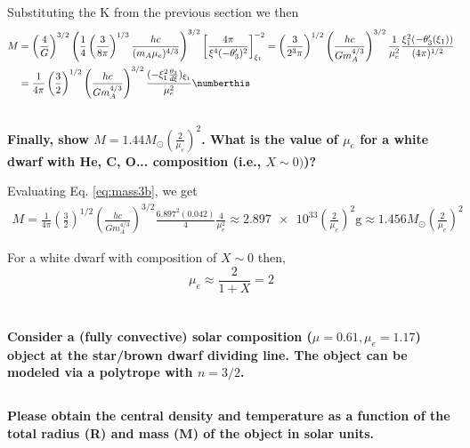 Substituting the K from the previous section we then
\begin{align*}
    M &= \left(\frac{4}{G}\right)^{3/2}\left(\frac{1}{4}\left(\frac{3}{8\pi}\right)^{1/3}\frac{hc}{(m_A\mu_e)^{4/3}}\right)^{3/2}\left[\frac{4\pi}{\xi^{4}(-\theta^\prime_3)^{2}}\right]^{-2}_{\xi_1} 
    = \left(\frac{3}{2^3\pi}\right)^{1/2}\left(\frac{hc}{Gm_A^{4/3}}\right)^{3/2}\frac{1}{\mu_e^2}\frac{\xi_1^2(-\theta_3^\prime(\xi_1))}{(4\pi)^{1/2}} \\
    &= \frac{1}{4\pi}\left(\frac{3}{2}\right)^{1/2}\left(\frac{hc}{Gm_A^{4/3}}\right)^{3/2}\frac{(-\xi_1^2\frac{\theta_3}{d\xi})_{\xi_1}}{\mu_e^2} \numberthis\label{eq:mass3b}
\end{align*}



\subsection{}
\textbf{Finally, show $M=1.44M_\odot\left(\frac{2}{\mu_e}\right)^2$. What is the value of $\mu_e$ for a white dwarf with He, C, O... composition (i.e., $X\sim0)$)?}

Evaluating Eq. \ref{eq:mass3b}, we get
\begin{align*}
    M = \frac{1}{4\pi}\left(\frac{3}{2}\right)^{1/2}\left(\frac{hc}{Gm_A^{4/3}}\right)^{3/2}\frac{6.897^2(0.042)}{4}\frac{4}{\mu_e^2} \approx \num{2.897e33}\left(\frac{2}{\mu_e}\right)^2\si{\g} \approx 1.456 M_\odot \left(\frac{2}{\mu_e}\right)^2
\end{align*}

For a white dwarf with composition of $X\sim0$ then, 
\begin{equation*}
    \mu_e \approx \frac{2}{1+X} = 2 
\end{equation*}


\section{}
\textbf{Consider a (fully convective) solar composition ($\mu = 0.61, \mu_e = 1.17$) object at the star/brown dwarf dividing line.
The object can be modeled via a polytrope with $n = 3/2$.}
\subsection{}
\textbf{Please obtain the central density and temperature as a function of the total radius (R) and mass (M) of the object in solar units.}

